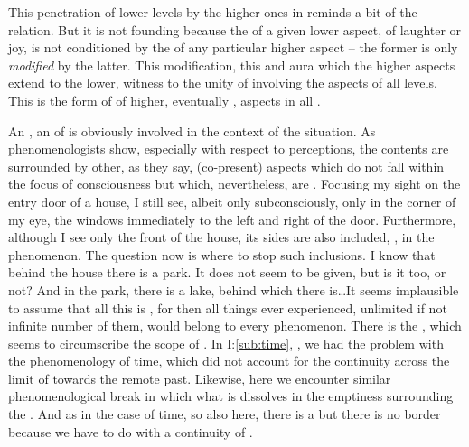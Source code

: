 This penetration of lower levels by the higher ones in  reminds a bit of the  relation.  But it is
not founding because the  of a given lower aspect, of laughter or
joy, is not conditioned by the  of any particular higher aspect --
the former is only {\em modified} by the latter.  This modification, this
 and aura which the higher aspects extend to the lower, witness to the
unity of  involving the aspects of all levels.  This is the
form of  of higher, eventually , aspects in all
.

\newpa 

\pa An , an  of  is obviously
involved in the context of the  situation.  As phenomenologists show,
especially with respect to perceptions, the  contents are surrounded
by other, as they say,  (co-present) aspects which do not fall within the
focus of consciousness but which, nevertheless, are .  Focusing
my sight on the entry door of a house, I still see, albeit only subconsciously,
only in the corner of my eye, the windows immediately to the left and right of
the door.  Furthermore, although I see only the front of the house, its sides
are also included, , in the  phenomenon.  The
question now is where to stop such inclusions.  I know that behind the house
there is a park.  It does not seem to be given, but is it  too,
or not?  And in the park, there is a lake, behind which there is\ldots It seems
implausible to assume that all this is , for then all things
ever experienced, unlimited if not infinite number of them, would belong to
every phenomenon. There is the \hoa, which seems to circumscribe the scope of
. In I:\ref{sub:time}, , we had the
problem with the phenomenology of time, which did not account for the continuity
across the limit of  towards the remote past. Likewise, here we
encounter similar phenomenological break in which what is 
dissolves in the emptiness surrounding the \hoa. And as in the case of time, so
also here, there is a  but there is no border because we have to
do with a continuity of .

